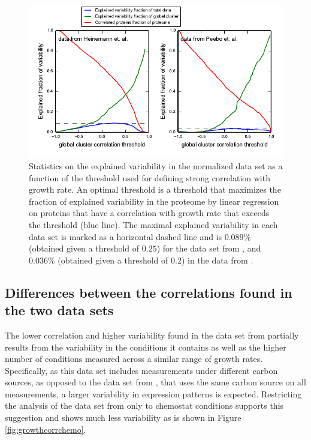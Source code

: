 \documentclass[a4paper]{article}
\newcommand{\hMaxExpVar}{0.089}
\newcommand{\vnMaxExpVar}{0.036}
\newcommand{\vMaxExpVar}{\vnMaxExpVar{}}
\begin{document}
\begin{figure}[H]
\begin{center}
\includegraphics[width=1\columnwidth]{ExpVar3.pdf}
\caption{\label{fig:threshold}
  Statistics on the explained variability in the normalized data set as a function of the threshold used for defining strong correlation with growth rate.
  An optimal threshold is a threshold that maximizes the fraction of explained variability in the proteome by linear regression on proteins that have a correlation with growth rate that exceeds the threshold (blue line).
  The maximal explained variability in each data set is marked as a horizontal dashed line and is $\hMaxExpVar{}\%$ (obtained given a threshold of $0.25$) for the data set from \cite{Heinemann2015}, and $\vMaxExpVar{}\%$ (obtained given a threshold of $0.2$) in the data from \cite{Peebo_2015}.
%
}
\end{center}
\end{figure}

\subsection{Differences between the correlations found in the two data sets}
\label{heinemannchemo} 

The lower correlation and higher variability found in the data set from \cite{Heinemann2015} partially results from the variability in the conditions it contains as well as the higher number of conditions measured across a similar range of growth rates.
Specifically, as this data set includes measurements under different carbon sources, as opposed to the data set from \cite{Valgepea2013}, that uses the same carbon source on all measurements, a larger variability in expression patterns is expected.
Restricting the analysis of the data set from \cite{Heinemann2015} only to chemostat conditions supports this suggestion and shows much less variability as is shown in Figure \ref{fig:growthcorrchemo}.
\end{document}
